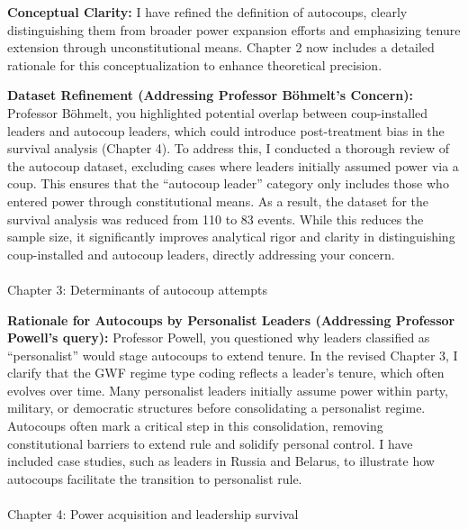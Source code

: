 \documentclass[
  12pt,
  letterpaper,
  DIV=11,
  numbers=noendperiod]{scrartcl}
\makeatletter
\let\oldparagraph\paragraph
\renewcommand{\paragraph}{
    \@ifstar
      \xxxParagraphStar
      \xxxParagraphNoStar
  }
\newcommand{\xxxParagraphStar}[1]{\oldparagraph*{#1}\mbox{}}
\newcommand{\xxxParagraphNoStar}[1]{\oldparagraph{#1}\mbox{}}
\makeatother
\begin{document}
\textbf{Conceptual Clarity:} I have refined the definition of autocoups,
clearly distinguishing them from broader power expansion efforts and
emphasizing tenure extension through unconstitutional means. Chapter 2
now includes a detailed rationale for this conceptualization to enhance
theoretical precision.

\textbf{Dataset Refinement (Addressing Professor Böhmelt's Concern):}
Professor Böhmelt, you highlighted potential overlap between
coup-installed leaders and autocoup leaders, which could introduce
post-treatment bias in the survival analysis (Chapter 4). To address
this, I conducted a thorough review of the autocoup dataset, excluding
cases where leaders initially assumed power via a coup. This ensures
that the ``autocoup leader'' category only includes those who entered
power through constitutional means. As a result, the dataset for the
survival analysis was reduced from 110 to 83 events. While this reduces
the sample size, it significantly improves analytical rigor and clarity
in distinguishing coup-installed and autocoup leaders, directly
addressing your concern.

\paragraph{Chapter 3: Determinants of autocoup
attempts}\label{chapter-3-determinants-of-autocoup-attempts}

\textbf{Rationale for Autocoups by Personalist Leaders (Addressing
Professor Powell's query):} Professor Powell, you questioned why leaders
classified as ``personalist'' would stage autocoups to extend tenure. In
the revised Chapter 3, I clarify that the GWF regime type coding
reflects a leader's tenure, which often evolves over time. Many
personalist leaders initially assume power within party, military, or
democratic structures before consolidating a personalist regime.
Autocoups often mark a critical step in this consolidation, removing
constitutional barriers to extend rule and solidify personal control. I
have included case studies, such as leaders in Russia and Belarus, to
illustrate how autocoups facilitate the transition to personalist rule.

\paragraph{Chapter 4: Power acquisition and leadership
survival}\label{chapter-4-power-acquisition-and-leadership-survival}
\end{document}
